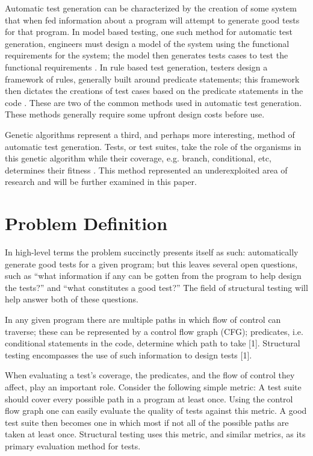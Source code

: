 \documentclass[runningheads]{llncs}
\begin{document}
Automatic test generation can be characterized by the creation of some system that when fed information about a program will attempt to generate good tests for that program. In model based testing, one such method for automatic test generation, engineers must design a model of the system using the functional requirements for the system; the model then generates tests cases to test the functional requirements \cite{model2}. In rule based test generation, testers design a framework of rules, generally built around predicate statements; this framework then dictates the creations of test cases based on the predicate statements in the code \cite{chang3}. These are two of the common methods used in automatic test generation. These methods generally require some upfront design costs before use. 

Genetic algorithms represent a third, and perhaps more interesting, method of automatic test generation. Tests, or test suites, take the role of the organisms in this genetic algorithm while their coverage, e.g. branch, conditional, etc, determines their fitness \cite{sthammer4}. This method represented an underexploited area of research and will be further examined in this paper. 


\section{Problem Definition}
In high-level terms the problem succinctly presents itself as such: automatically generate good tests for a given program; but this leaves several open questions, such as ``what information if any can be gotten from the program to help design the tests?'' and ``what constitutes a good test?'' The field of structural testing will help answer both of these questions.

In any given program there are multiple paths in which flow of control can traverse; these can be represented by a control flow graph (CFG); predicates, i.e. conditional statements in the code, determine which path to take [1]. Structural testing encompasses the use of such information to design tests [1].

When evaluating a test's coverage, the predicates, and the flow of control they affect, play an important role. Consider the following simple metric: A test suite should cover every possible path in a program at least once. Using the control flow graph one can easily evaluate the quality of tests against this metric. A good test suite then becomes one in which most if not all of the possible paths are taken at least once. Structural testing uses this metric, and similar metrics, as its primary evaluation method for tests.
\end{document}
